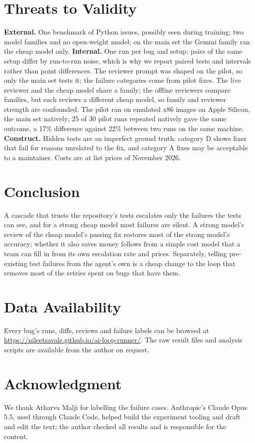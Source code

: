 \documentclass[10pt,conference]{IEEEtran}
\begin{document}
\section{Threats to Validity}
\textbf{External.} One benchmark of Python issues, possibly seen during training; two model families and no
open-weight model; on the main set the Gemini family ran the cheap model only. \textbf{Internal.} One run per bug and
setup: pairs of the same setup differ by run-to-run noise, which is why we report paired tests and intervals rather
than point differences. The reviewer prompt was shaped on the pilot, so only the main set tests it; the failure
categories come from pilot fixes. The live reviewer and the cheap model share a family; the offline reviewers
compare families, but each reviews a different cheap model, so family and reviewer strength are confounded. The pilot
ran on emulated x86 images on Apple Silicon, the main set natively; 25 of 30 pilot runs repeated natively gave the
same outcome, a 17\% difference against 22\% between two runs on the same machine.
\textbf{Construct.} Hidden tests are an imperfect ground truth: category D shows fixes that fail for reasons unrelated
to the fix, and category A fixes may be acceptable to a maintainer. Costs are at list prices of November 2026.

\section{Conclusion}
A cascade that trusts the repository's tests escalates only the failures the tests can see, and for a strong cheap
model most failures are silent. A strong model's review of the cheap model's passing fix restores most of the strong
model's accuracy; whether it also saves money follows from a simple cost model that a team can fill in from its own
escalation rate and prices. Separately, telling pre-existing test failures from the agent's own is a cheap
change to the loop that removes most of the retries spent on bugs that have them.

\section*{Data Availability}
Every bug's runs, diffs, reviews and failure labels can be browsed at
\url{https://nileetsavale.github.io/ai-loop-runner/}. The raw result files and analysis scripts are available from the
author on request.

\section*{Acknowledgment}
We thank Atharva Malji for labelling the failure cases. Anthropic's Claude Opus 5.5, used through Claude Code, helped build the
experiment tooling and draft and edit the text; the author checked all results and is responsible for the content.



\end{document}

